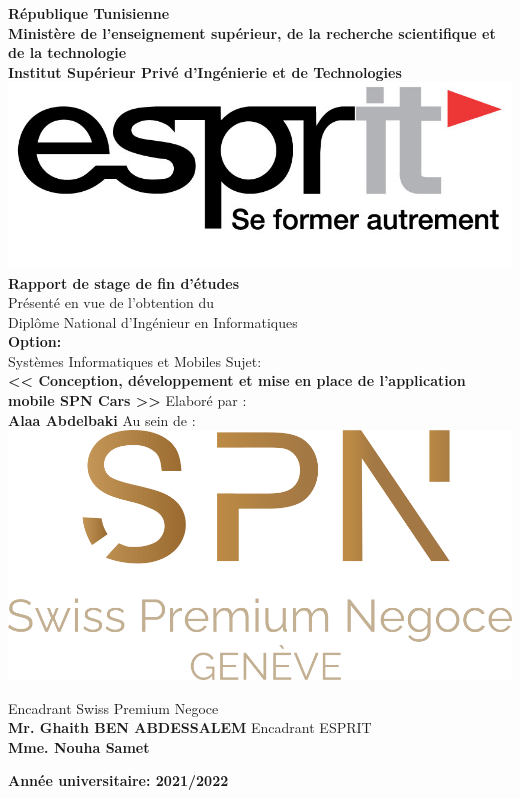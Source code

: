 \thispagestyle{empty}
\graphicspath{{./images/}}

\justifying
\centering

\centering
\textbf{{\footnotesize République Tunisienne}}\\
\textbf{{\footnotesize Ministère de l'enseignement supérieur, de la recherche scientifique et de la technologie}}\\
\textbf{{\footnotesize Institut Supérieur Privé d'Ingénierie et de Technologies}}\\
\bigbreak
\includegraphics[width=0.5\linewidth]{esprit.jpg} \\
\bigbreak
\textbf{{\huge Rapport de stage de fin d'études}} \\
\bigbreak
\bigbreak
\bigbreak
{\large Présenté en vue de l'obtention du} \\
\bigbreak
{\large Diplôme National d'Ingénieur en Informatiques} \\
\bigbreak
\textbf{{\large Option:}}\\
\bigbreak
{\large Systèmes Informatiques et Mobiles}
\bigbreak
\bigbreak
\bigbreak
{\large Sujet:}\\
\bigbreak
\textbf{{\Large << Conception, développement et mise en place de l'application mobile SPN Cars >>}}
\bigbreak
\bigbreak
\bigbreak
{\large Elaboré par :}\\
\bigbreak
\textbf{{\large Alaa Abdelbaki}}
\bigbreak
\bigbreak
{\large Au sein de :}
\bigbreak
\includegraphics[width=0.5\linewidth]{spn_logo.png}
\bigbreak
\begin{multicols}{2}
    \centering
    Encadrant Swiss Premium Negoce\\ \textbf{Mr. Ghaith BEN ABDESSALEM}
    Encadrant ESPRIT\\ \textbf{Mme. Nouha Samet}
\end{multicols}
\vspace*{\fill}
\textbf{\footnotesize Année universitaire: 2021/2022}
\newpage
\thispagestyle{empty}
\
\newpage




